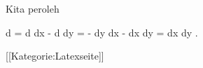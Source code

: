 Kita peroleh

\mavergleichskettealign
{\vergleichskettealign
{d \omega
}
{ =} { d {  } \wedge dx - d {  } \wedge dy
}
{ =} { - {  } dy  \wedge dx  -   {  }  dx \wedge dy
}
{ =} { {  }  dx \wedge dy
}
{ } {
}
}
{}
{}{.}

 [[Kategorie:Latexseite]]
